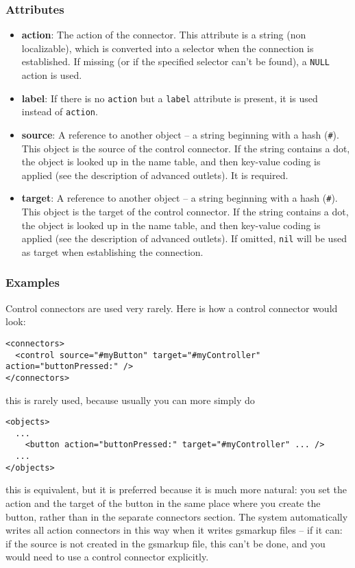 \subsubsection{Attributes}
\begin{itemize}
\item {\bf action}: The action of the connector.  This attribute is a
  string (non localizable), which is converted into a selector when
  the connection is established.  If missing (or if the specified
  selector can't be found), a \texttt{NULL} action is used.
\item {\bf label}: If there is no \texttt{action} but a \texttt{label}
  attribute is present, it is used instead of \texttt{action}.
\item {\bf source}: A reference to another object -- a string
  beginning with a hash (\texttt{\#}).  This object is the source of
  the control connector.  If the string contains a dot, the object is
  looked up in the name table, and then key-value coding is applied
  (see the description of advanced outlets).  It is required.
\item {\bf target}: A reference to another object -- a string
  beginning with a hash (\texttt{\#}).  This object is the target of
  the control connector.  If the string contains a dot, the object is
  looked up in the name table, and then key-value coding is applied
  (see the description of advanced outlets).  If omitted, \texttt{nil}
  will be used as target when establishing the connection.
\end{itemize}

\subsubsection{Examples}
Control connectors are used very rarely.  Here is how a control
connector would look:
\begin{verbatim}
<connectors>
  <control source="#myButton" target="#myController" action="buttonPressed:" />
</connectors>
\end{verbatim}
this is rarely used, because usually you can more simply do
\begin{verbatim}
<objects>
  ...
    <button action="buttonPressed:" target="#myController" ... />
  ...
</objects>
\end{verbatim}
this is equivalent, but it is preferred because it is much more
natural: you set the action and the target of the button in the same
place where you create the button, rather than in the separate
connectors section.  The system automatically writes all action
connectors in this way when it writes gsmarkup files -- if it can: if the
source is not created in the gsmarkup file, this can't be done, and you
would need to use a control connector explicitly.

